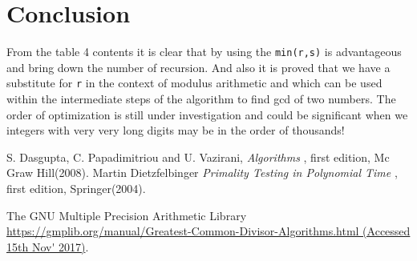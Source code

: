 \documentclass[12pt]{article}
\begin{document}
\section{Conclusion}
From the table 4 contents it is clear that by using the \texttt{min(r,s)} is advantageous and bring down the number of recursion. And also it is proved that we have a substitute for \texttt{r} in the context of modulus arithmetic and which can be used within the intermediate steps of the algorithm to find gcd of two numbers. The order of optimization is still under investigation and could be significant when we integers with very very long digits may be in the order of thousands!


\begin{thebibliography}{6}

S. Dasgupta, C. Papadimitriou and U. Vazirani, \textsl{Algorithms
},
first edition, Mc Graw Hill(2008).
Martin Dietzfelbinger \textsl{Primality Testing in Polynomial Time
},
first edition, Springer(2004).

The GNU Multiple Precision Arithmetic Library \url{https://gmplib.org/manual/Greatest-Common-Divisor-Algorithms.html (Accessed 15th Nov' 2017)}.

\end{thebibliography}
\end{document}
